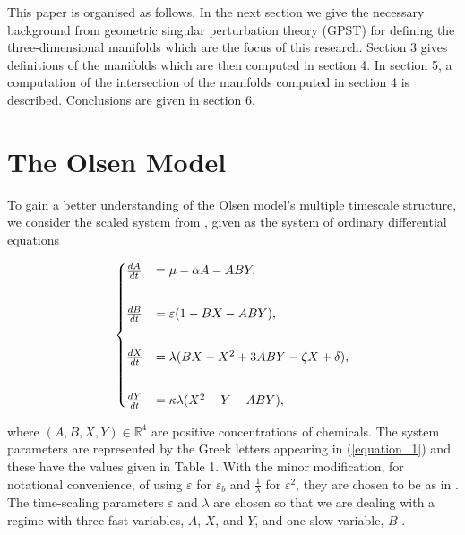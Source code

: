 \documentclass{ws-ijbc}
\begin{document}
This paper is organised as follows.  In the next section we give the necessary background from geometric singular perturbation theory (GPST) for defining the three-dimensional manifolds which are the focus of this research.  Section 3 gives definitions of the manifolds which are then computed in section 4.  In section 5, a computation of the intersection of the manifolds computed in section 4 is described.  Conclusions are given in section 6.

\section{The Olsen Model}

To gain a better understanding of the Olsen model's multiple timescale structure, we consider the scaled system from \cite{Rescaling}, given as the system of ordinary differential equations
    
\begin{equation}
\begin{aligned}
\begin{cases}
\frac{dA}{dt} &= \mu - \alpha A - ABY, \\ \vspace{2mm}\\
\frac{dB}{dt} &= \varepsilon(1-BX - ABY), \\ \vspace{2mm}\\
\frac{dX}{dt} &= \lambda(BX - X^2 +3ABY - \zeta X + \delta), \\ \vspace{2mm}\\
\frac{dY}{dt} &= \kappa\lambda(X^2 - Y - ABY),
\end{cases}
\end{aligned}
\label{equation_1}
\end{equation}
    
\noindent
where $(A, B, X, Y)\in\mathbb{R}^{4}$ are positive concentrations of chemicals.  The system parameters are represented by the Greek letters appearing in (\ref{equation_1}) and these have the values given in Table 1.  With the minor modification, for notational convenience, of using $\varepsilon$ for $\varepsilon_{b}$ and $\frac{1}{\lambda}$ for $\varepsilon^{2}$, they are chosen to be as in \cite{Rescaling}.  The time-scaling parameters $\varepsilon$ and $\lambda$ are chosen so that we are dealing with a regime with three fast variables, $A$, $X$, and $Y$, and one slow variable, $B$ \cite{Rescaling}.
\end{document}
